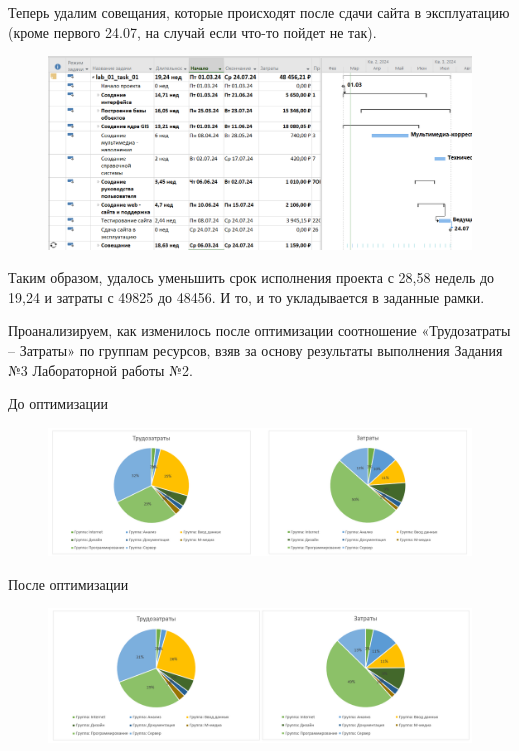 Теперь удалим совещания, которые происходят после сдачи сайта в
эксплуатацию (кроме первого 24.07, на случай если что-то пойдет не так).

\begin{figure}[h!]
	\begin{center}
		\includegraphics[scale=0.4]{inc/img/p_18.png}
	\end{center}
	\captionsetup{justification=centering}
	\label{fig:u3}
\end{figure}

Таким образом, удалось уменьшить срок исполнения проекта с 28,58 недель до 19,24 и затраты с 49825 до 48456. И то, и то укладывается в заданные рамки.

Проанализируем, как изменилось после оптимизации соотношение
«Трудозатраты – Затраты» по группам ресурсов, взяв за основу результаты выполнения Задания №3 Лабораторной работы №2. 

До оптимизации

\begin{figure}[h!]
	\begin{center}
		\includegraphics[scale=0.44]{inc/img/p_19.png}
	\end{center}
	\captionsetup{justification=centering}
	\label{fig:u3}
\end{figure}

После оптимизации 

\begin{figure}[h!]
	\begin{center}
		\includegraphics[scale=0.45]{inc/img/p_20.png}
	\end{center}
	\captionsetup{justification=centering}
	\label{fig:u3}
\end{figure}

